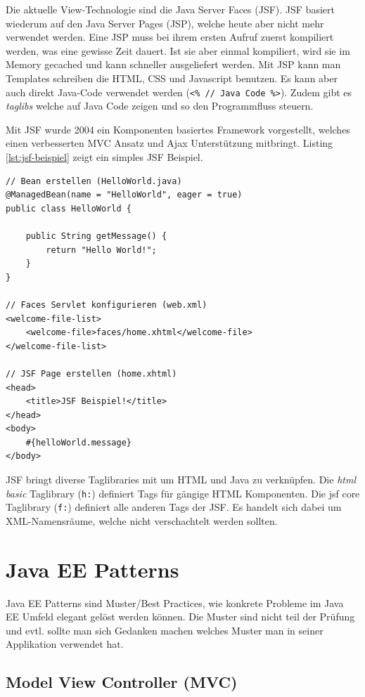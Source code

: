 Die aktuelle View-Technologie sind die Java Server Faces (JSF). JSF basiert wiederum auf den Java Server Pages (JSP), welche heute aber nicht mehr verwendet werden. Eine JSP muss bei ihrem ersten Aufruf zuerst kompiliert werden, was eine gewisse Zeit dauert. Ist sie aber einmal kompiliert, wird sie im Memory gecached und kann schneller ausgeliefert werden. Mit JSP kann man Templates schreiben die HTML, CSS und Javascript benutzen. Es kann aber auch direkt Java-Code verwendet werden (\verb|<% // Java Code %>|). Zudem gibt es \textit{taglibs} welche auf Java Code zeigen und so den Programmfluss steuern.

Mit JSF wurde 2004 ein Komponenten basiertes Framework vorgestellt, welches einen verbesserten MVC Ansatz und Ajax Unterstützung mitbringt. Listing \ref{lst:jsf-beispiel} zeigt ein simples JSF Beispiel.

\begin{lstlisting}[caption=JSF Beispiel, label=lst:jsf-beispiel]
// Bean erstellen (HelloWorld.java)
@ManagedBean(name = "HelloWorld", eager = true)
public class HelloWorld {

	public String getMessage() {
		return "Hello World!";
	}
}

// Faces Servlet konfigurieren (web.xml)
<welcome-file-list>
	<welcome-file>faces/home.xhtml</welcome-file>
</welcome-file-list>

// JSF Page erstellen (home.xhtml)
<head>
	<title>JSF Beispiel!</title>
</head>
<body>
	#{helloWorld.message}
</body>
\end{lstlisting}

JSF bringt diverse Taglibraries mit um HTML und Java zu verknüpfen. Die \textit{html basic} Taglibrary (\verb|h:|) definiert Tags für gängige HTML Komponenten. Die jsf core Taglibrary (\verb|f:|) definiert alle anderen Tags der JSF. Es handelt sich dabei um XML-Namensräume, welche nicht verschachtelt werden sollten.

\section{Java EE Patterns}
Java EE Patterns sind Muster/Best Practices, wie konkrete Probleme im Java EE Umfeld elegant gelöst werden können. Die Muster sind nicht teil der Prüfung und evtl. sollte man sich Gedanken machen welches Muster man in seiner Applikation verwendet hat.

\subsection{Model View Controller (MVC)}

